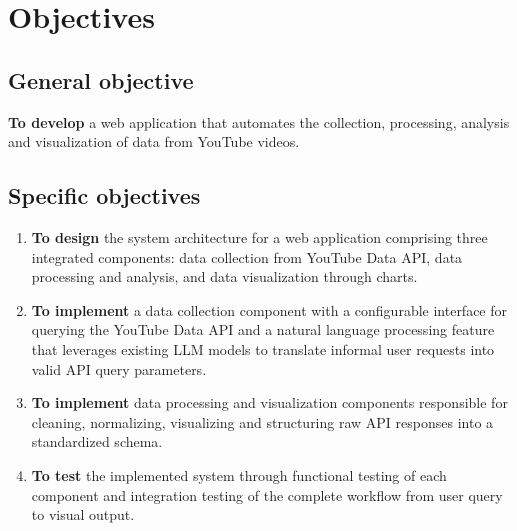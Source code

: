 \section{Objectives}
\label{chap:objectives}

\subsection{General objective}

\textbf{To develop} a web application that automates the collection, processing, analysis and visualization of data from YouTube videos.

\subsection{Specific objectives}

\begin{enumerate}
	\item \label{obj:design} \textbf{To design} the system architecture for a web application comprising three integrated components: data collection from YouTube Data API, data processing and analysis, and data visualization through charts.

	\item \label{obj:implement_collection} \textbf{To implement} a data collection component with a configurable interface for querying the YouTube Data API and a natural language processing feature that leverages existing LLM models to translate informal user requests into valid API query parameters.

	\item \label{obj:implement_processing_and_visualization} \textbf{To implement} data processing and visualization components responsible for cleaning, normalizing, visualizing and structuring raw API responses into a standardized schema.

	\item \label{obj:test} \textbf{To test} the implemented system through functional testing of each component and integration testing of the complete workflow from user query to visual output.
\end{enumerate}
